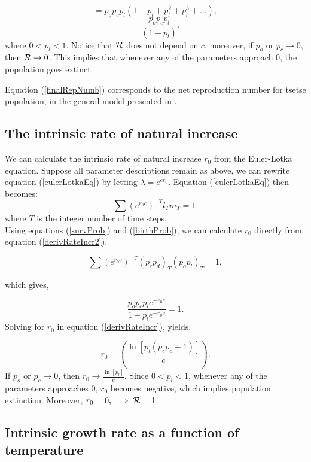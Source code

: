 \documentclass[12pt,a4paper]{article}
\begin{document}
$$=p_op_cp_l (1 + p_l + p_l^2 + p_l^3 + ...),$$
\begin{equation}
\label{finalRepNumb} 
=\frac{p_op_cp_l}{(1-p_l)},
\end{equation}
where $0 < p_l < 1$. Notice that ${\cal R}$ does not depend on $c$, moreover, if $p_o$ or $p_c \rightarrow{0}$, then ${\cal R} \rightarrow{0}$. This implies that whenever any of the parameters approach $0$, the population goes extinct.

Equation  (\ref{finalRepNumb}) corresponds to the net reproduction number for tsetse population, in the general model presented in \cite{Are2019a}.

\subsection*{The intrinsic rate of natural increase}
We can calculate the intrinsic rate of natural increase $r_0$ from the  Euler-Lotka equation.  Suppose all parameter descriptions remain as above, we can rewrite equation (\ref{eulerLotkaEq}) by letting $\lambda= e^{cr_0}$. Equation (\ref{eulerLotkaEq}) then becomes:
\begin{equation}
\label{derivRateIncr2} 
\sum (e^{r_0c})^{-T}l_{T}m_{T} =1.
\end{equation}
where $ T $ is the integer number of time steps. \\

Using equations  (\ref{survProb}) and  (\ref{birthProb}), we can calculate $r_0$ directly from equation (\ref{derivRateIncr2}).


$$\sum (e^{r_0c})^{-T}(p_cp_d)_{T}(p_op_l)_{T} =1,$$

which gives, 

\begin{equation}
\label{derivRateIncr} 
\frac{p_op_cp_le^{-r_0c}}{1-p_le^{-r_0c}} =1.
\end{equation}
Solving for $r_0$ in equation (\ref{derivRateIncr}), yields, 

\begin{equation}
\label{finalRateIncrs} 
r_0 = (\frac{\ln[p_l(p_cp_o+1)]}{c}).
\end{equation}
If  $p_o$ or $p_c \rightarrow{0}$, then  $r_0 \rightarrow{\frac{\ln[p_l]}{c}}$. Since $0 < p_l < 1$, whenever any of the parameters approaches $0$, $r_0$ becomes negative, which implies  population extinction. Moreover, $r_0 = 0, \implies {\cal R} = 1$.  


\subsection*{Intrinsic growth rate as a function of temperature}
\end{document}

